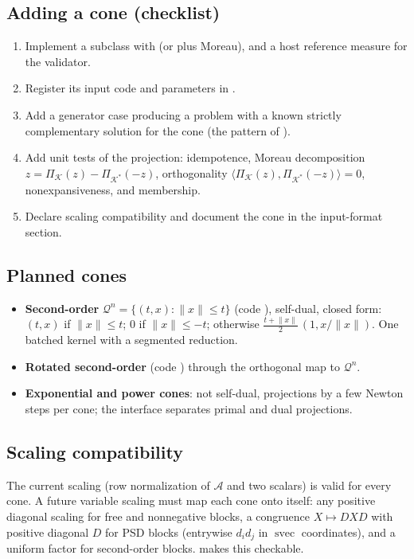 \documentclass[11pt]{article}
\newcommand{\K}{\mathcal{K}}
\newcommand{\Kd}{\mathcal{K}^{*}}
\newcommand{\A}{\mathcal{A}}
\newcommand{\Proj}{\Pi}
\newcommand{\inner}[2]{\langle #1, #2\rangle}
\newcommand{\norm}[1]{\lVert #1\rVert}
\newcommand{\svec}{\operatorname{svec}}
\begin{document}
\subsection{Adding a cone (checklist)}
\begin{enumerate}
  \item Implement a  subclass with  (or  plus Moreau),
   and a host reference measure for the validator.
  \item Register its input code and parameters in .
  \item Add a generator case producing a problem with a known strictly complementary solution for the cone
  (the pattern of ).
  \item Add unit tests of the projection: idempotence, Moreau decomposition $z = \Proj_\K(z) - \Proj_{\Kd}(-z)$,
  orthogonality $\inner{\Proj_\K(z)}{\Proj_{\Kd}(-z)} = 0$, nonexpansiveness, and membership.
  \item Declare scaling compatibility and document the cone in the input-format section.
\end{enumerate}

\subsection{Planned cones}
\begin{itemize}
  \item \textbf{Second-order} $\mathcal{Q}^n = \{(t,x): \norm{x}\le t\}$ (code ), self-dual, closed form:
  $(t,x)$ if $\norm{x}\le t$; $0$ if $\norm{x}\le -t$; otherwise
  $\tfrac{t+\norm{x}}{2}\,(1, x/\norm{x})$. One batched kernel with a segmented reduction.
  \item \textbf{Rotated second-order} (code ) through the orthogonal map to $\mathcal{Q}^n$.
  \item \textbf{Exponential and power cones}: not self-dual, projections by a few Newton steps per cone;
  the interface separates primal and dual projections.
\end{itemize}

\subsection{Scaling compatibility}
The current scaling (row normalization of $\A$ and two scalars) is valid for every cone. A future variable
scaling must map each cone onto itself: any positive diagonal scaling for free and nonnegative blocks, a
congruence $X\mapsto DXD$ with positive diagonal $D$ for PSD blocks (entrywise $d_id_j$ in $\svec$
coordinates), and a uniform factor for second-order blocks.  makes this
checkable.
\end{document}
